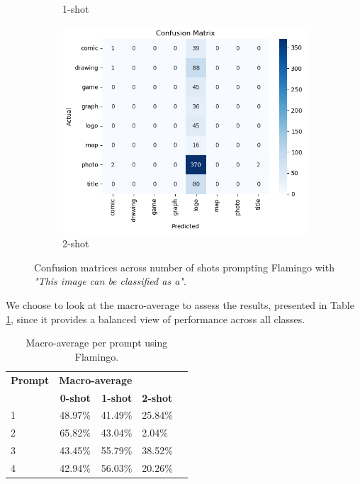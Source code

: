 \begin{figure}[ht]
\begin{subfigure}{0.31\textwidth}
        \caption{1-shot}
        \label{fig:cm-p2-1s}
    \end{subfigure}
    \hfill
    \begin{subfigure}{0.31\textwidth}
        \includegraphics[width=\linewidth]{Images/cm-flam-p2-2s.png}
        \caption{2-shot}
        \label{fig:cm-p2-2s}
    \end{subfigure}

    \caption{Confusion matrices across number of shots prompting Flamingo with \textit{"This image can be classified as a"}.}
    \label{fig:avg-acc-trans}
\end{figure} 

We choose to look at the macro-average to assess the results, presented in Table \ref{tab:overall-flam-res}, since it provides a balanced view of performance across all classes.

\begin{table}[ht]
    \centering
    \begin{tabularx}{\textwidth}{|X|r|r|X|X|}
        \hline
        \textbf{Prompt} & \multicolumn{2}{c|}{\textbf{Macro-average}} \\
        & \textbf{0-shot} & \textbf{1-shot} & \textbf{2-shot} \\
        \hline
        1 & 48.97\% & 41.49\% & 25.84\%  \\
        \hline
        2 & 65.82\% & 43.04\% & 2.04\% &  \\
        \hline
        3 & 43.45\% & 55.79\% &  38.52\% &  \\
        \hline
        4 & 42.94\% & 56.03\% &  20.26\% &  \\
        \hline
    \end{tabularx}
    \caption{Macro-average per prompt using Flamingo.}
    \label{tab:overall-flam-res}
\end{table}

